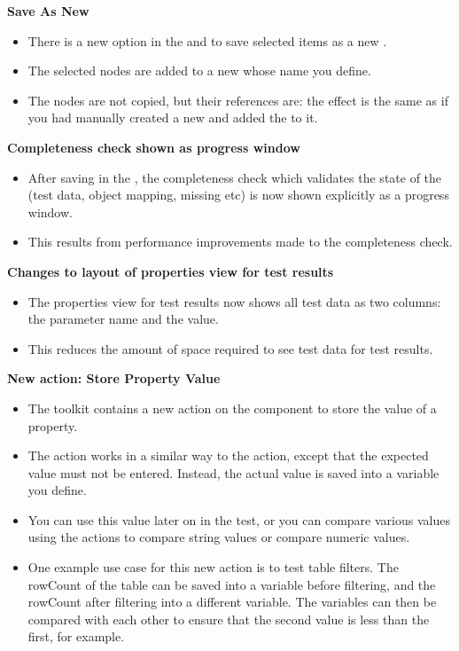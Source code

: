 \textbf{Save As New \gdcase{}}
\begin{itemize}
\item There is a new option in the \gdtestcaseeditor{} and \gdtestsuiteeditor{} to save selected items as a new \gdcase{}.
\item The selected nodes are added to a new \gdcase{} whose name you define.
\item The nodes are not copied, but their references are: the effect is the same as if you had manually created a new \gdcase{} and added the \gdcases{} to it. 
\end{itemize}

\textbf{Completeness check shown as progress window}\\
\begin{itemize}
\item After saving in the \ite{}, the completeness check which validates the state of the \gdproject{} (test data, object mapping, missing \gdcases{} etc) is now shown explicitly as a progress window.
\item This results from performance improvements made to the completeness check.
\end{itemize} 

\textbf{Changes to layout of properties view for test results}\\
\begin{itemize}
\item The properties view for test results now shows all test data as two columns: the parameter name and the value.
\item This reduces the amount of space required to see test data for test results. 
\end{itemize} 

\textbf{New action: Store Property Value}\\
\begin{itemize}
\item The  toolkit contains a new action on the  component to store the value of a property.
\item The action works in a similar way to the  action, except that the expected value must not be entered. Instead, the actual value is saved into a variable you define.
\item You can use this value later on in the test, or you can compare various values using the actions to compare string values or compare numeric values. 
\item One example use case for this new action is to test table filters. The rowCount of the table can be saved into a variable before filtering, and the rowCount after filtering into a different variable. The variables can then be compared with each other to ensure that the second value is less than the first, for example.
\end{itemize} 
